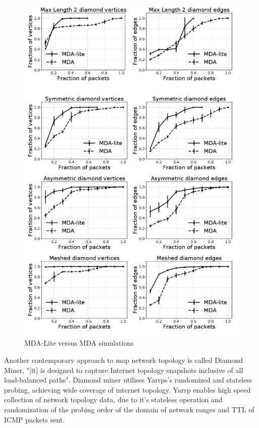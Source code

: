 \begin{figure}[!ht]
  \begin{center}
    \includegraphics[scale=0.3]{images/MDA_lite.png}
    \caption{MDA-Lite versus MDA simulations\cite{MDA-lite}}
    \label{figure:MDA_lite_fig}
  \end{center}
\end{figure}

Another contemporary approach to map network topology is called Diamond Miner, "[it] is designed to capture Internet topology snapshots inclusive of all load-balanced paths". \cite{diamond-miner} Diamond miner utilises Yarrps's randomized and stateless probing, achieving wide coverage of internet topology. Yarrp enables high speed collection of network topology data, due to it's stateless operation and randomization of the probing order of the domain of network ranges and TTL of ICMP packets sent. \cite{yarrp}


